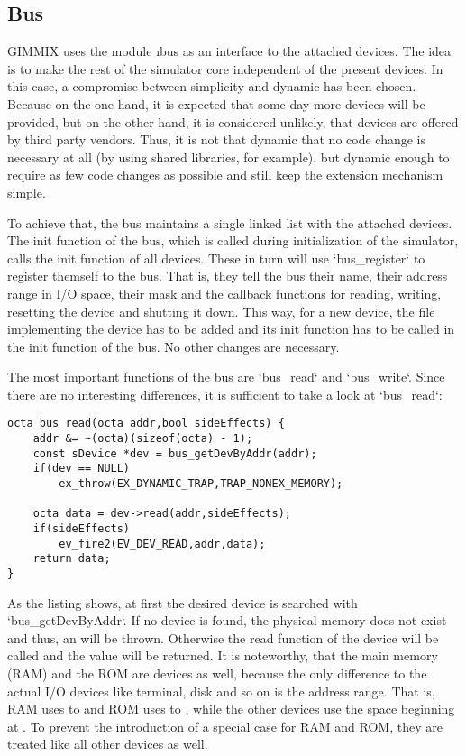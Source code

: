 \subsection{Bus}

GIMMIX uses the module \i{bus} as an interface to the attached devices. The idea is to make the rest of the simulator core independent of the present devices. In this case, a compromise between simplicity and dynamic has been chosen. Because on the one hand, it is expected that some day more devices will be provided, but on the other hand, it is considered unlikely, that devices are offered by third party vendors. Thus, it is not that dynamic that no code change is necessary at all (by using shared libraries, for example), but dynamic enough to require as few code changes as possible and still keep the extension mechanism simple.

To achieve that, the bus maintains a single linked list with the attached devices. The init function of the bus, which is called during initialization of the simulator, calls the init function of all devices. These in turn will use `bus_register` to register themself to the bus. That is, they tell the bus their name, their address range in I/O space, their  mask and the callback functions for reading, writing, resetting the device and shutting it down. This way, for a new device, the file implementing the device has to be added and its init function has to be called in the init function of the bus. No other changes are necessary.

The most important functions of the bus are `bus_read` and `bus_write`. Since there are no interesting differences, it is sufficient to take a look at `bus_read`:
\begin{lstlisting}[language=GIMMIXC,caption={Implementation of {\tt bus\_read}}]
octa bus_read(octa addr,bool sideEffects) {
	addr &= ~(octa)(sizeof(octa) - 1);
	const sDevice *dev = bus_getDevByAddr(addr);
	if(dev == NULL)
		ex_throw(EX_DYNAMIC_TRAP,TRAP_NONEX_MEMORY);

	octa data = dev->read(addr,sideEffects);
	if(sideEffects)
		ev_fire2(EV_DEV_READ,addr,data);
	return data;
}
\end{lstlisting}
As the listing shows, at first the desired device is searched with `bus_getDevByAddr`. If no device is found, the physical memory does not exist and thus, an  will be thrown. Otherwise the read function of the device will be called and the value will be returned. It is noteworthy, that the main memory (RAM) and the ROM are devices as well, because the only difference to the actual I/O devices like terminal, disk and so on is the address range. That is, RAM uses  to  and ROM uses  to , while the other devices use the space beginning at . To prevent the introduction of a special case for RAM and ROM, they are treated like all other devices as well.
